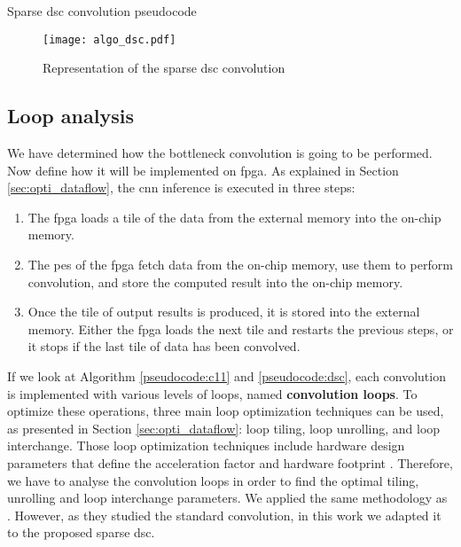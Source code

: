 \begin{enumerate}
\begin{algorithm}[H]
\begin{algorithmic}
                        \EndFor
                    \EndFor
                \EndFor
            \EndFor
        \end{algorithmic}
        \caption{Sparse \acrshort{dsc} convolution pseudocode}
        \label{pseudocode:dsc}
    \end{algorithm}
    \begin{figure}[H]
        \centering
        \texttt{[image: algo\_dsc.pdf]}
        \caption{Representation of the sparse \acrshort{dsc} convolution}
        \label{fig:algo_dsc}
    \end{figure}
\end{enumerate}
%
\subsection{Loop analysis}
%
We have determined how the bottleneck convolution is going to be performed. Now define how it will be implemented on \acrshort{fpga}. As explained in Section \ref{sec:opti_dataflow}, the \acrshort{cnn} inference is executed in three steps:
%
\begin{enumerate}
    \item The \acrshort{fpga} loads a tile of the data from the external memory into the on-chip memory.
    \item The \acrshort{pe}s of the \acrshort{fpga} fetch data from the on-chip memory, use them to perform convolution, and store the computed result into the on-chip memory.
    \item Once the tile of output results is produced, it is stored into the external memory. Either the \acrshort{fpga} loads the next tile and restarts the previous steps, or it stops if the last tile of data has been convolved.
\end{enumerate}
%
If we look at Algorithm \ref{pseudocode:c11} and \ref{pseudocode:dsc}, each convolution is implemented with various levels of loops, named \textbf{convolution loops}. To optimize these operations, three main loop optimization techniques can be used, as presented in Section \ref{sec:opti_dataflow}: loop tiling, loop unrolling, and loop interchange. Those loop optimization techniques include hardware design parameters that define the acceleration factor and hardware footprint \cite{ma_optimizing_2018}. Therefore, we have to analyse the convolution loops in order to find the optimal tiling, unrolling and loop interchange parameters. We applied the same methodology as \textcite{ma_optimizing_2018}. However, as they studied the standard convolution, in this work we adapted it to the proposed sparse \acrshort{dsc}.\cite{ma_optimizing_2018}

